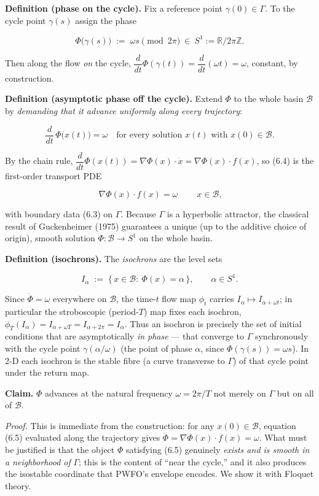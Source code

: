 \documentclass[
  11pt,
]{article}
\begin{document}
\textbf{Definition (phase on the cycle).} Fix a reference point
\(\gamma(0)\in\Gamma\). To the cycle point \(\gamma(s)\) assign the
phase

\[
\Phi\big(\gamma(s)\big)\;:=\;\omega s \pmod{2\pi}\ \in\ S^1:=\mathbb{R}/2\pi\mathbb{Z}.
\tag{6.3}
\]

Then along the flow \emph{on} the cycle,
\(\dfrac{d}{dt}\Phi(\gamma(t))=\dfrac{d}{dt}(\omega t)=\omega\),
constant, by construction.

\textbf{Definition (asymptotic phase off the cycle).} Extend \(\Phi\) to
the whole basin \(\mathcal B\) by \emph{demanding that it advance
uniformly along every trajectory}:

\[
\frac{d}{dt}\,\Phi\big(x(t)\big)=\omega
\quad\text{for every solution } x(t)\text{ with } x(0)\in\mathcal B .
\tag{6.4}
\]

By the chain rule,
\(\dfrac{d}{dt}\Phi(x(t))=\nabla\Phi(x)\cdot \dot x=\nabla\Phi(x)\cdot f(x)\),
so (6.4) is the first-order transport PDE

\[
\boxed{\ \nabla\Phi(x)\cdot f(x)=\omega\ }\qquad x\in\mathcal B,
\tag{6.5}
\]

with boundary data (6.3) on \(\Gamma\). Because \(\Gamma\) is a
hyperbolic attractor, the classical result of Guckenheimer (1975)
guarantees a unique (up to the additive choice of origin), smooth
solution \(\Phi:\mathcal B\to S^1\) on the whole basin.

\textbf{Definition (isochrons).} The \emph{isochrons} are the level sets

\[
I_\alpha \;:=\;\{\,x\in\mathcal B:\ \Phi(x)=\alpha\,\},\qquad \alpha\in S^1 .
\tag{6.6}
\]

Since \(\dot\Phi=\omega\) everywhere on \(\mathcal B\), the time-\(t\)
flow map \(\phi_t\) carries \(I_\alpha\mapsto I_{\alpha+\omega t}\); in
particular the stroboscopic (period-\(T\)) map fixes each isochron,
\(\phi_T(I_\alpha)=I_{\alpha+\omega T}=I_{\alpha+2\pi}=I_\alpha\). Thus
an isochron is precisely the set of initial conditions that are
asymptotically \emph{in phase} --- that converge to \(\Gamma\)
synchronously with the cycle point \(\gamma(\alpha/\omega)\) (the point
of phase \(\alpha\), since \(\Phi(\gamma(s))=\omega s\)). In 2-D each
isochron is the stable fibre (a curve transverse to \(\Gamma\)) of that
cycle point under the return map.

\textbf{Claim.} \(\Phi\) advances at the natural frequency
\(\omega=2\pi/T\) not merely on \(\Gamma\) but on all of \(\mathcal B\).

\emph{Proof.} This is immediate from the construction: for any
\(x(0)\in\mathcal B\), equation (6.5) evaluated along the trajectory
gives \(\dot\Phi=\nabla\Phi(x)\cdot f(x)=\omega\). What must be
justified is that the object \(\Phi\) satisfying (6.5) genuinely
\emph{exists and is smooth in a neighborhood of} \(\Gamma\); this is the
content of ``near the cycle,'' and it also produces the isostable
coordinate that PWFO's envelope encodes. We show it with Floquet theory.
\end{document}
